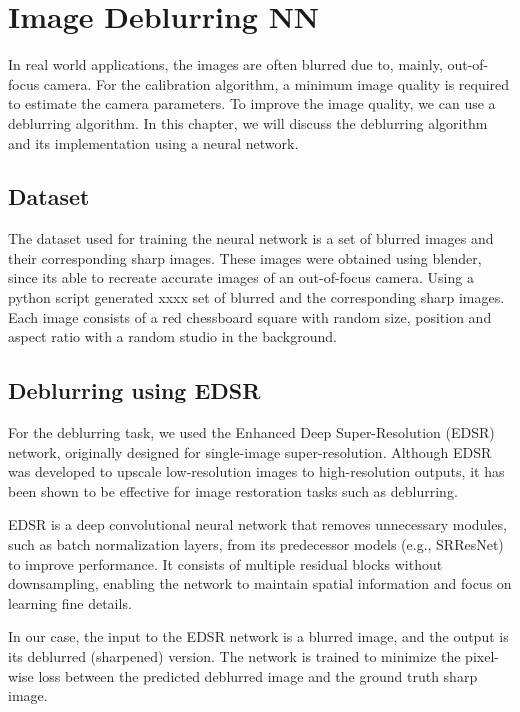 \chapter{Image Deblurring NN} \label{chap:Time}

In real world applications, the images are often blurred due to, mainly, out-of-focus camera.
For the calibration algorithm, a minimum image quality is required to estimate the camera parameters.
To improve the image quality, we can use a deblurring algorithm. In this chapter, we will discuss the deblurring algorithm and 
its implementation using a neural network.

\section{Dataset}

The dataset used for training the neural network is a set of blurred images and their corresponding sharp images. 
These images were obtained using blender, since its able to recreate accurate images of an out-of-focus camera.
Using a python script generated xxxx set of blurred and the corresponding sharp images. Each image consists of a red chessboard square 
with random size, position and aspect ratio with a random studio in the background.

\section{Deblurring using EDSR}

For the deblurring task, we used the Enhanced Deep Super-Resolution (EDSR) network, originally designed for single-image 
super-resolution. Although EDSR was developed to upscale low-resolution images to high-resolution outputs, it has been shown to 
be effective for image restoration tasks such as deblurring.

EDSR is a deep convolutional neural network that removes unnecessary modules, such as batch normalization layers, from its 
predecessor models (e.g., SRResNet) to improve performance. It consists of multiple residual blocks without downsampling, enabling the network 
to maintain spatial information and focus on learning fine details.

In our case, the input to the EDSR network is a blurred image, and the output is its deblurred (sharpened) version. The network is trained to 
minimize the pixel-wise loss between the predicted deblurred image and the ground truth sharp image.

